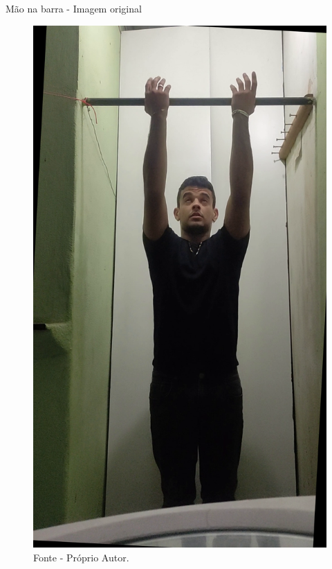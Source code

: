 \begin{frame}{Mão na barra - Imagem original}
    \begin{figure}[!ht]
    \centering
    \includegraphics[scale=0.1]{img/desenvolvimento/maoBarra/original.png}
    \caption*{Fonte - Próprio Autor.}
    \end{figure}
\end{frame}


